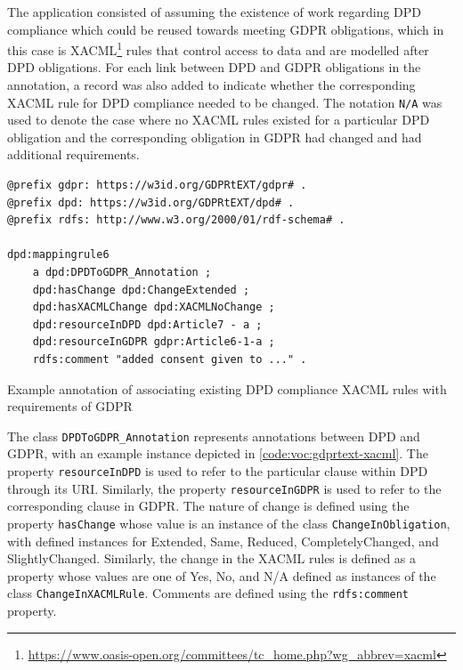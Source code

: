 The application consisted of assuming the existence of work regarding DPD compliance which could be reused towards meeting GDPR obligations, which in this case is XACML\footnote{\url{https://www.oasis-open.org/committees/tc_home.php?wg_abbrev=xacml}} rules that control access to data and are modelled after DPD obligations.
For each link between DPD and GDPR obligations in the annotation, a record was also added to indicate whether the corresponding XACML rule for DPD compliance needed to be changed. The notation \texttt{N/A} was used to denote the case where no XACML rules existed for a particular DPD obligation and the corresponding obligation in GDPR had changed and had additional requirements. 
\begin{listing}[htbp]
\begin{verbatim}
@prefix gdpr: https://w3id.org/GDPRtEXT/gdpr# .
@prefix dpd: https://w3id.org/GDPRtEXT/dpd# .
@prefix rdfs: http://www.w3.org/2000/01/rdf-schema# .

dpd:mappingrule6
    a dpd:DPDToGDPR_Annotation ;
    dpd:hasChange dpd:ChangeExtended ;
    dpd:hasXACMLChange dpd:XACMLNoChange ;
    dpd:resourceInDPD dpd:Article7 - a ;
    dpd:resourceInGDPR gdpr:Article6-1-a ;
    rdfs:comment "added consent given to ..." .
\end{verbatim}
\label{code:voc:gdprtext-xacml}
\caption{Example annotation of associating existing DPD compliance XACML rules with requirements of GDPR}
\end{listing}

The class \texttt{DPDToGDPR\_Annotation} represents annotations between DPD and GDPR, with an example instance depicted in \autoref{code:voc:gdprtext-xacml}. The property \texttt{resourceInDPD} is used to refer to the particular clause within DPD through its URI. Similarly, the property \texttt{resourceInGDPR} is used to refer to the corresponding clause in GDPR. The nature of change is defined using the property \texttt{hasChange} whose value is an instance of the class \texttt{ChangeInObligation}, with defined instances for Extended, Same, Reduced, CompletelyChanged, and SlightlyChanged. Similarly, the change in the XACML rules is defined as a property whose values are one of Yes, No, and N/A defined as instances of the class \texttt{ChangeInXACMLRule}. Comments are defined using the \texttt{rdfs:comment} property.

